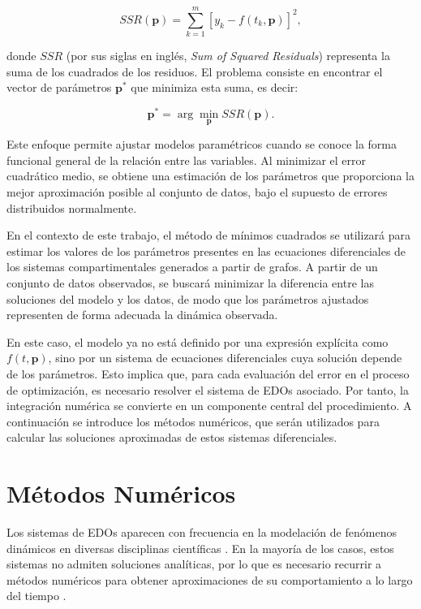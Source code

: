\[
SSR(\mathbf{p}) = \sum_{k=1}^{m} [y_k - f(t_k, \mathbf{p})]^2,
\]

donde \( SSR \) (por sus siglas en inglés, \textit{Sum of Squared Residuals}) representa la suma de los cuadrados de los residuos. El problema consiste en encontrar 
el vector de parámetros \( \mathbf{p}^* \) que minimiza esta suma, es decir:

\[
\mathbf{p}^* = \arg \min_{\mathbf{p}} SSR(\mathbf{p}).
\]

Este enfoque permite ajustar modelos paramétricos cuando se conoce la forma funcional general de la relación entre las variables. Al minimizar el error 
cuadrático medio, se obtiene una estimación de los parámetros que proporciona la mejor aproximación posible al conjunto de datos, bajo el supuesto de 
errores distribuidos normalmente.

En el contexto de este trabajo, el método de mínimos cuadrados se utilizará para estimar los valores de los parámetros presentes en las ecuaciones diferenciales 
de los sistemas compartimentales generados a partir de grafos. A partir de un conjunto de datos observados, se buscará minimizar la diferencia entre las 
soluciones del modelo y los datos, de modo que los parámetros ajustados representen de forma adecuada la dinámica observada.

En este caso, el modelo ya no está definido por una expresión explícita como \( f(t, \mathbf{p}) \), sino por un sistema de ecuaciones diferenciales cuya solución 
depende de los parámetros. Esto implica que, para cada evaluación del error en el proceso de optimización, es necesario resolver el sistema de EDOs asociado. 
Por tanto, la integración numérica se convierte en un componente central del procedimiento. A continuación se introduce los m\'etodos num\'ericos, que serán utilizados 
para calcular las soluciones aproximadas de estos sistemas diferenciales.

\section{M\'etodos Num\'ericos}
\label{sec:metodos-numericos}

Los sistemas de EDOs aparecen con frecuencia en la modelación de fenómenos dinámicos en diversas disciplinas científicas \cite{Boyce2012}. En la mayoría de los casos, 
estos sistemas no admiten soluciones analíticas, por lo que es necesario recurrir a métodos numéricos para obtener aproximaciones de su comportamiento a lo largo 
del tiempo \cite{Burden2011}.

